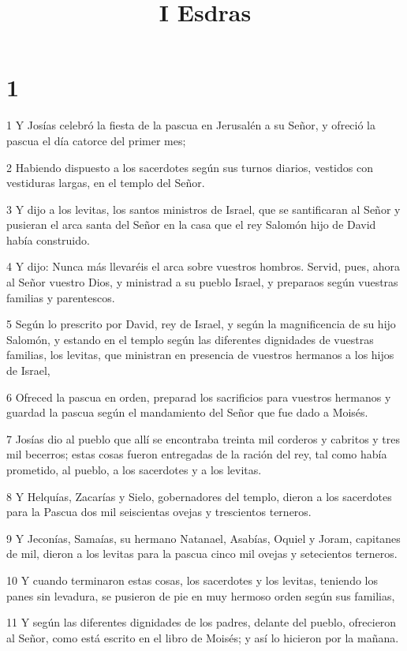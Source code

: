 

\title{I Esdras}


\chapter{1}

\par 1 Y Josías celebró la fiesta de la pascua en Jerusalén a su Señor, y ofreció la pascua el día catorce del primer mes;
\par 2 Habiendo dispuesto a los sacerdotes según sus turnos diarios, vestidos con vestiduras largas, en el templo del Señor.
\par 3 Y dijo a los levitas, los santos ministros de Israel, que se santificaran al Señor y pusieran el arca santa del Señor en la casa que el rey Salomón hijo de David había construido.
\par 4 Y dijo: Nunca más llevaréis el arca sobre vuestros hombros. Servid, pues, ahora al Señor vuestro Dios, y ministrad a su pueblo Israel, y preparaos según vuestras familias y parentescos.
\par 5 Según lo prescrito por David, rey de Israel, y según la magnificencia de su hijo Salomón, y estando en el templo según las diferentes dignidades de vuestras familias, los levitas, que ministran en presencia de vuestros hermanos a los hijos de Israel,
\par 6 Ofreced la pascua en orden, preparad los sacrificios para vuestros hermanos y guardad la pascua según el mandamiento del Señor que fue dado a Moisés.
\par 7 Josías dio al pueblo que allí se encontraba treinta mil corderos y cabritos y tres mil becerros; estas cosas fueron entregadas de la ración del rey, tal como había prometido, al pueblo, a los sacerdotes y a los levitas.
\par 8 Y Helquías, Zacarías y Sielo, gobernadores del templo, dieron a los sacerdotes para la Pascua dos mil seiscientas ovejas y trescientos terneros.
\par 9 Y Jeconías, Samaías, su hermano Natanael, Asabías, Oquiel y Joram, capitanes de mil, dieron a los levitas para la pascua cinco mil ovejas y setecientos terneros.
\par 10 Y cuando terminaron estas cosas, los sacerdotes y los levitas, teniendo los panes sin levadura, se pusieron de pie en muy hermoso orden según sus familias,
\par 11 Y según las diferentes dignidades de los padres, delante del pueblo, ofrecieron al Señor, como está escrito en el libro de Moisés; y así lo hicieron por la mañana.
